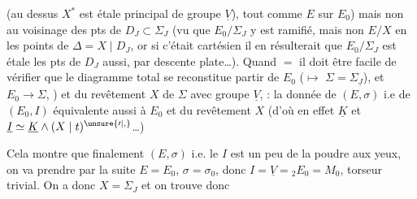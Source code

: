 (au dessus  $X^*$ est étale  principal de groupe $\underline V$), tout comme $E$ sur $E_0$) mais non au voisinage des pts de $D_J\subset\Sigma_J$ (vu que $E_0/\Sigma_J$ y est ramifié, mais non $E/X$ en les points de $\Delta=X\mid D_J$, or si c'était cartésien il en résulterait que $E_0/\Sigma_J$ est étale  les pts de $D_J$ aussi, par descente plate\ldots). Quand $=$ il doit être facile de vérifier que le diagramme total se reconstitue  partir de $E_0$ ($\longmapsto$  $\Sigma=\Sigma_{\underline J}$), et $E_0\longrightarrow\Sigma$, ) et du revêtement  $X$ de $\Sigma$ avec groupe  $\underline V$, : la donnée de $(E,\sigma)$ i.e de $(E_0,I)$   équivalente aussi à $E_0$ et du revêtement $X$ (d'où en effet $\underline K$ et $\underline I\simeq\underline K\wedge(X\mid t)^{\unsure{\prime|,}}$\ldots)

Cela montre que finalement $(E,\sigma)$ i.e. le $I$ est un peu de la poudre aux yeux, on va prendre par la suite $E=E_0$, $\sigma=\sigma_0$, donc $I=\underline V={}_2E_0=M_0$, torseur trivial. On a donc  $X=\Sigma_J$ et on trouve donc
